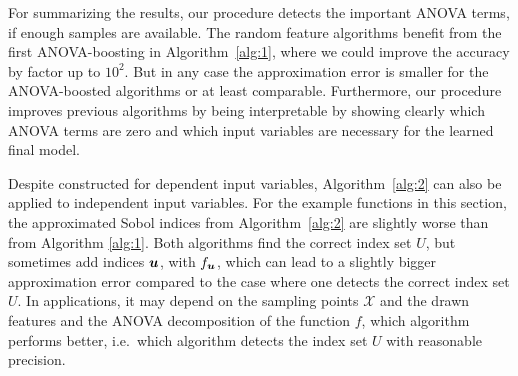 \documentclass{article}
\renewcommand{\vec}[1]{\ensuremath \mathbf{\boldsymbol{#1}}}
\newcommand{\X}{\ensuremath{\mathcal{X}}}
\theoremstyle{definition}
\numberwithin{equation}{section}
\begin{document}
For summarizing the results, our procedure detects the important ANOVA terms, if enough samples are available. The random feature algorithms benefit from the first ANOVA-boosting in Algorithm~\ref{alg:1}, where we could improve the accuracy by factor up to $10^2$. But in any case the approximation error is smaller for the ANOVA-boosted algorithms or at least comparable. Furthermore, our procedure improves previous algorithms by being interpretable by showing clearly which ANOVA terms are zero and which input variables are necessary for the learned final model.\par
Despite constructed for dependent input variables, Algorithm~\ref{alg:2} can also be applied to independent input variables. For the example functions in this section, 
the approximated Sobol indices from Algorithm~\ref{alg:2} are slightly worse than from Algorithm \ref{alg:1}. Both algorithms find the correct index set $U$, but sometimes add indices $\vec u$, with $f_{\vec u}$, which can lead to a slightly bigger approximation error compared to the case where one detects the correct index set $U$. In applications, it may depend on the sampling points $\X$ and the drawn features and the ANOVA decomposition of the function $f$, which algorithm performs better, i.e.~which algorithm detects the index set $U$ with reasonable precision.
\end{document}
